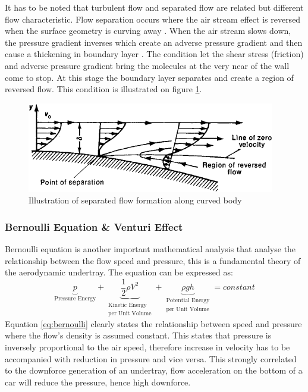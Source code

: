 \noindent It has to be noted that turbulent flow and separated flow are related but different flow characteristic. Flow separation occurs where the air stream effect is reversed when the surface geometry is curving away . When the air stream slows down, the pressure gradient inverses which create an adverse pressure gradient and then cause a thickening in boundary layer \cite{Scibor-Rylski1984RoadAerodynamics}. The condition let the shear stress (friction) and adverse pressure gradient bring the molecules at the very near of the wall come to stop. At this stage the boundary layer separates  and create a region of reversed flow. This condition is illustrated on figure \ref{fig:flow separation}.

\begin{figure}[!ht]
    \centering
    \includegraphics[scale= 0.8]{Figures/flow_separation.png}
    \caption{Illustration of separated flow formation along curved body \cite{Anonymous1979SeparationDictionary}}
    \label{fig:flow separation}
\end{figure}

\subsubsection{Bernoulli Equation \& Venturi Effect}
Bernoulli equation is another important mathematical analysis that analyse the relationship between the flow speed and pressure, this is a fundamental theory of the aerodynamic undertray. The equation can be expressed as:
\begin{equation}
   \underbrace{p}_\textrm{Pressure Energy} + \underbrace{\frac{1}{2} \rho V^{2}}_{\substack{\text{Kinetic Energy} \\ \text{per Unit Volume}}} + \underbrace{\rho g h}_{\substack{\text{Potential Energy} \\ \text{per Unit Volume}}} = constant
    \label{eq:bernoulli}
\end{equation}
Equation \ref{eq:bernoulli} clearly states the relationship between speed and pressure where the flow's density is assumed constant. This states that pressure is inversely proportional to the air speed, therefore increase in velocity has to be accompanied with reduction in pressure and vice versa. This strongly correlated to the downforce generation of an undertray, flow acceleration on the bottom of a car will reduce the pressure, hence high downforce.

